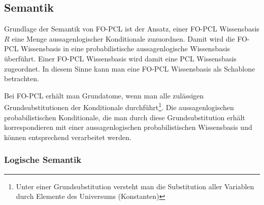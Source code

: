 \documentclass[a4paper, 11pt]{book}
\begin{document}
\subsection{Semantik}\label{sec:semantik}
Grundlage der Semantik von FO-PCL ist der Ansatz, einer FO-PCL Wissensbasis $ R $ eine Menge aussagenlogischer Konditionale zuzuordnen. Damit wird die FO-PCL Wissensbasis  in eine probabilistische aussagenlogische Wissensbasis überführt. Einer FO-PCL Wissensbasis wird damit eine PCL Wissensbasis zugeordnet. In diesem Sinne kann man eine FO-PCL Wissensbasis als Schablone betrachten.

Bei FO-PCL erhält man Grundatome, wenn man alle zulässigen Grundsubstitutionen der Konditionale durchführt\footnote{Unter einer Grundsubstitution versteht man die Substitution aller Variablen durch Elemente des Universums (Konstanten)}.
Die aussagenlogischen probabilistischen Konditionale, die man durch diese Grundsubstitution erhält korrespondieren mit einer aussagenlogischen probabilistischen Wissensbasis und können entsprechend verarbeitet werden.


\subsubsection{Logische Semantik} 
\end{document}
